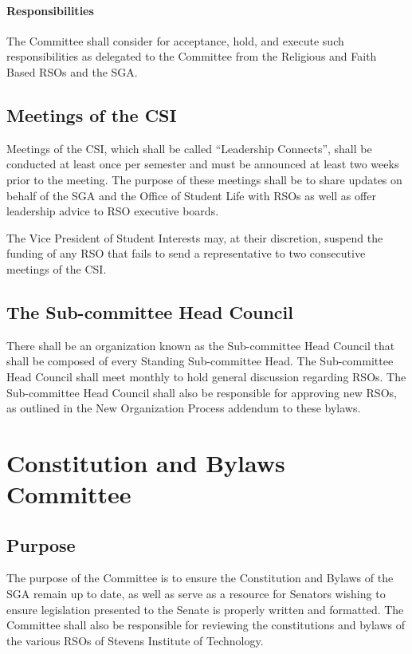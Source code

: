 \documentclass[12pt]{scrreprt}
\begin{document}
\paragraph{Responsibilities}
​The Committee shall consider for acceptance, hold, and execute such responsibilities as delegated to the Committee from the Religious and Faith Based RSOs and the SGA.

\subsection{Meetings of the CSI}
Meetings of the CSI, which shall be called ``Leadership Connects'', shall be conducted at least once per semester and must be announced at least two weeks prior to the meeting. The purpose of these meetings shall be to share updates on behalf of the SGA and the Office of Student Life with RSOs as well as offer leadership advice to RSO executive boards.

The Vice President of Student Interests may, at their discretion, suspend the funding of any RSO that fails to send a representative to two consecutive meetings of the CSI.

\subsection{The Sub-committee Head Council}
There shall be an organization known as the Sub-committee Head Council that shall be composed of every Standing Sub-committee Head. The Sub-committee Head Council shall meet monthly to hold general discussion regarding RSOs. The Sub-committee Head Council shall also be responsible for approving new RSOs, as outlined in the New Organization Process addendum to these bylaws.

\section{Constitution and Bylaws Committee}

\subsection{Purpose}
The purpose of the Committee is to ensure the Constitution and Bylaws of the SGA remain up
to date, as well as serve as a resource for Senators wishing to ensure legislation presented to the Senate is properly written and formatted. The Committee shall also be responsible for reviewing the constitutions and bylaws of the various RSOs of Stevens Institute of Technology.
\end{document}
